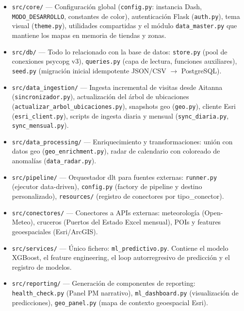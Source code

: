 \documentclass[12pt, a4paper]{article}
\begin{document}
\begin{itemize}
  \item \texttt{src/core/} — Configuración global (\texttt{config.py}: instancia Dash, \texttt{MODO\_DESARROLLO}, constantes de color), autenticación Flask (\texttt{auth.py}), tema visual (\texttt{theme.py}), utilidades compartidas y el módulo \texttt{data\_master.py} que mantiene los mapas en memoria de tiendas y zonas.

  \item \texttt{src/db/} — Todo lo relacionado con la base de datos: \texttt{store.py} (pool de conexiones psycopg v3), \texttt{queries.py} (capa de lectura, funciones auxiliares), \texttt{seed.py} (migración inicial idempotente JSON/CSV $\rightarrow$ PostgreSQL).

  \item \texttt{src/data\_ingestion/} — Ingesta incremental de visitas desde Aitanna (\texttt{sincronizador.py}), actualización del árbol de ubicaciones (\texttt{actualizar\_arbol\_ubicaciones.py}), snapshots geo (\texttt{geo.py}), cliente Esri (\texttt{esri\_client.py}), scripts de ingesta diaria y mensual (\texttt{sync\_diaria.py}, \texttt{sync\_mensual.py}).

  \item \texttt{src/data\_processing/} — Enriquecimiento y transformaciones: unión con datos geo (\texttt{geo\_enrichment.py}), radar de calendario con coloreado de anomalías (\texttt{data\_radar.py}).

  \item \texttt{src/pipeline/} — Orquestador dlt para fuentes externas: \texttt{runner.py} (ejecutor data-driven), \texttt{config.py} (factory de pipeline y destino personalizado), \texttt{resources/} (registro de conectores por tipo\_conector).

  \item \texttt{src/conectores/} — Conectores a APIs externas: meteorología (Open-Meteo), cruceros (Puertos del Estado Excel mensual), POIs y features geoespaciales (Esri/ArcGIS).

  \item \texttt{src/services/} — Único fichero: \texttt{ml\_predictivo.py}. Contiene el modelo XGBoost, el feature engineering, el loop autorregresivo de predicción y el registro de modelos.

  \item \texttt{src/reporting/} — Generación de componentes de reporting: \texttt{health\_check.py} (Panel PM narrativo), \texttt{ml\_dashboard.py} (visualización de predicciones), \texttt{geo\_panel.py} (mapa de contexto geoespacial Esri).


\end{itemize}
\end{document}
